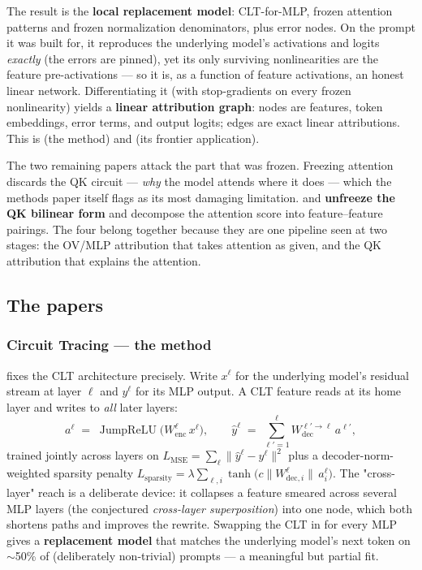 The result is the \textbf{local replacement model}: CLT-for-MLP, frozen attention patterns and frozen normalization denominators, plus error nodes. On the prompt it was built for, it reproduces the underlying model's activations and logits \emph{exactly} (the errors are pinned), yet its only surviving nonlinearities are the feature pre-activations --- so it is, as a function of feature activations, an honest linear network. Differentiating it (with stop-gradients on every frozen nonlinearity) yields a \textbf{linear attribution graph}: nodes are features, token embeddings, error terms, and output logits; edges are exact linear attributions. This is \textcite{circuit-tracing-computational-graphs} (the method) and \textcite{on-the-biology-of-a-large-language-model} (its frontier application).

The two remaining papers attack the part that was frozen. Freezing attention discards the QK circuit --- \emph{why} the model attends where it does --- which the methods paper itself flags as its most damaging limitation. \textcite{tracing-attention-feature-interactions} and \textcite{progress-on-attention} \textbf{unfreeze the QK bilinear form} and decompose the attention score into feature--feature pairings. The four belong together because they are one pipeline seen at two stages: the OV/MLP attribution that takes attention as given, and the QK attribution that explains the attention.

\subsection*{The papers}

\subsubsection*{Circuit Tracing --- the method}

\textcite{circuit-tracing-computational-graphs} fixes the CLT architecture precisely. Write $x^{\ell}$ for the underlying model's residual stream at layer $\ell$ and $y^{\ell}$ for its MLP output. A CLT feature reads at its home layer and writes to \emph{all} later layers:
\[
a^{\ell} \;=\; \operatorname{JumpReLU}\!\big(W_{\text{enc}}^{\ell}\, x^{\ell}\big),
\qquad
\hat y^{\ell} \;=\; \sum_{\ell'=1}^{\ell} W_{\text{dec}}^{\ell'\to\ell}\, a^{\ell'},
\]
trained jointly across layers on $L_{\text{MSE}}=\sum_{\ell}\lVert \hat y^{\ell}-y^{\ell}\rVert^{2}$ plus a decoder-norm-weighted sparsity penalty $L_{\text{sparsity}}=\lambda\sum_{\ell,i}\tanh\!\big(c\lVert W_{\text{dec},i}^{\ell}\rVert\, a_i^{\ell}\big)$. The "cross-layer" reach is a deliberate device: it collapses a feature smeared across several MLP layers (the conjectured \emph{cross-layer superposition}) into one node, which both shortens paths and improves the rewrite. Swapping the CLT in for every MLP gives a \textbf{replacement model} that matches the underlying model's next token on $\sim$50\% of (deliberately non-trivial) prompts --- a meaningful but partial fit.


